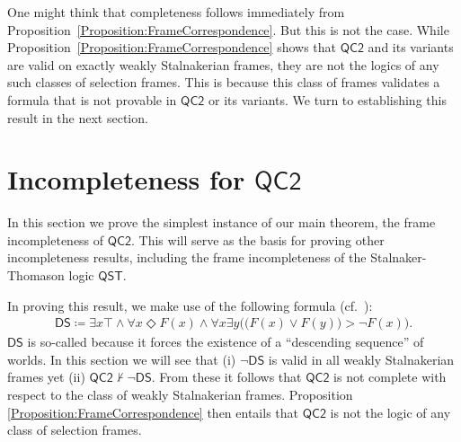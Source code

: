 \documentclass[12pt]{article}
\newcommand{\would}{\mathbin{>}}
\newcommand{\pos}{\mathop{\Diamond}}
\newcommand{\then}{\mathbin{\supset}}
\begin{document}

One might think that completeness follows immediately from Proposition~\ref{Proposition:FrameCorrespondence}. 
But this is not the case. 
While Proposition~\ref{Proposition:FrameCorrespondence} shows that $\mathsf{QC2}$ and its variants are valid on exactly weakly Stalnakerian frames, they are not the logics of any such classes of selection frames. 
This is because this class of frames validates a formula that is not provable in $\mathsf{QC2}$ or its variants. 
We turn to establishing this result in the next section. 

\section{Incompleteness for $\mathsf{QC2}$}
\label{Section:Proof of Incompleteness}

In this section we prove the simplest instance of our main theorem, the frame incompleteness of $\mathsf{QC2}$. 
This will serve as the basis for proving other incompleteness results, including the frame incompleteness of the Stalnaker-Thomason logic $\mathsf{QST}$. 

In proving this result, we make use of the following formula (cf.~\cite[p.~182]{Montagna1984provability}):
\begin{align*}
    \mathsf{DS} \coloneqq \exists x\top \wedge \forall x \pos F(x) \wedge \forall x \exists y \Big( \big( F(x) \vee F(y) \big) > \neg F(x)\Big).
\end{align*}
$\mathsf{DS}$ is so-called because it forces the existence of a ``descending sequence'' of worlds. 
In this section we will see that (i) $\neg \mathsf{DS}$ is valid in all weakly Stalnakerian frames yet (ii) $\mathsf{QC2}\nvdash \neg \mathsf{DS}$. From these it follows that $\mathsf{QC2}$ is not complete with respect to the class of weakly Stalnakerian frames. 
Proposition \ref{Proposition:FrameCorrespondence} then entails that $\mathsf{QC2}$ is not the logic of any class of selection frames. 
\end{document}
